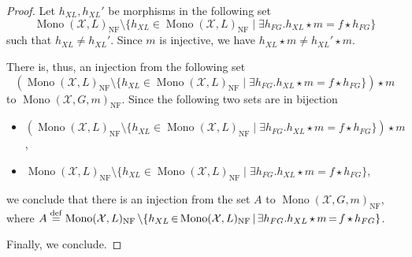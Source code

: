 \begin{proof}
    Let $h_{XL}, h_{XL}'$ be morphisms in the following set
     $$\operatorname{Mono}(\mathcal{X},L)_{\operatorname{NF}}\mathop{\setminus} \{
                h_{XL} \mathop{\in} \operatorname{Mono}(\mathcal{X},L)_{\operatorname{NF}} \mathop{\mid} 
                \exists h_{FG}. h_{XL} \mathop{\star} m \mathop{=} f \mathop{\star} h_{FG}
    \}$$
    such that $h_{XL} \mathop{\neq} h_{XL}'$.
    Since $m$ is injective, we have $h_{XL} \mathop{\star} m \mathop{\neq} h_{XL}' \mathop{\star} m$. 
 
    There is, thus, an injection from the following set
 $$  (\operatorname{Mono}(\mathcal{X},L)_{\operatorname{NF}}\mathop{\setminus} \{
                h_{XL} \mathop{\in} \operatorname{Mono}(\mathcal{X},L)_{\operatorname{NF}} \mathop{\mid} 
                \exists h_{FG}. h_{XL} \mathop{\star} m \mathop{=} f \mathop{\star} h_{FG}
            \}) \mathop{\star} m$$
    to $\operatorname{Mono}(\mathcal{X},G,m)_{\operatorname{NF}}$.
    Since the following two sets are in bijection
    \begin{itemize}
        \item $(\operatorname{Mono}(\mathcal{X},L)_{\operatorname{NF}}\mathop{\setminus} \{
                h_{XL} \mathop{\in} \operatorname{Mono}(\mathcal{X},L)_{\operatorname{NF}} \mathop{\mid} 
                \exists h_{FG}. h_{XL} \mathop{\star} m \mathop{=} f \mathop{\star} h_{FG}
            \}) \mathop{\star} m$, 
        \item $\operatorname{Mono}(\mathcal{X},L)_{\operatorname{NF}}\mathop{\setminus} \{
                h_{XL} \mathop{\in} \operatorname{Mono}(\mathcal{X},L)_{\operatorname{NF}} \mathop{\mid} 
                \exists h_{FG}. h_{XL} \mathop{\star} m \mathop{=} f \mathop{\star} h_{FG}
            \}$,
    \end{itemize} 
    we conclude that there is an injection from the set $A$ to $\operatorname{Mono}(\mathcal{X},G,m)_{\operatorname{NF}}$, where $A \overset{\operatorname{def}}{=} \operatorname{Mono}(\mathcal{X},L)_{\operatorname{NF}}\mathop{\setminus} \{
                h_{XL} \mathop{\in} \operatorname{Mono}(\mathcal{X},L)_{\operatorname{NF}} \mathop{\mid} 
                \exists h_{FG}. h_{XL} \mathop{\star} m \mathop{=} f \mathop{\star} h_{FG}
            \}$.

    Finally, we conclude.
\end{proof}



